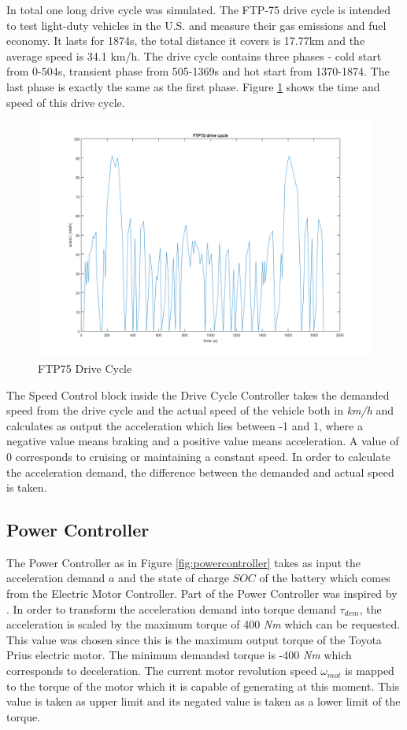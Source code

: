 In total one long drive cycle was simulated. The FTP-75 drive cycle is intended to test light-duty vehicles in the U.S. and measure their gas emissions and fuel economy. It lasts for 1874s, the total distance it covers is 17.77km and the average speed is 34.1 km/h. The drive cycle contains three phases - cold start from 0-504s, transient phase from 505-1369s and hot start from 1370-1874. The last phase is exactly the same as the first phase. Figure \ref{fig:ftp75} shows the time and speed of this drive 
cycle.

\begin{figure}[h]
\centering
\includegraphics[scale=0.3]{figures/FTP75}
\caption{FTP75 Drive Cycle}
\label{fig:ftp75}
\end{figure}


The Speed Control block inside the Drive Cycle Controller takes the demanded speed from the drive cycle and the actual speed of the vehicle both in \textit{km/h} and calculates as output the acceleration which lies between -1 and 1, where a negative value means braking and a positive value means acceleration. A value of 0 corresponds to cruising or maintaining a constant speed. In order to calculate the acceleration demand, the difference between the demanded and actual speed is taken.

\subsection{Power Controller}
\label{subsec:powerContr}
The Power Controller as in Figure \ref{fig:powercontroller} takes as input the acceleration demand $a$ and the state of charge $SOC$ of the battery which comes from the Electric Motor Controller. Part of the Power Controller was inspired by \citep{hevMatlab}. In order to transform the acceleration demand into torque demand $\tau_{dem}$, the acceleration is scaled by the maximum torque of 400 \textit{Nm} which can be requested. This value was chosen since this is the maximum output torque of the Toyota Prius electric motor. The minimum demanded torque is -400 \textit{Nm} which corresponds to deceleration. The current motor revolution speed $\omega_{mot}$ is mapped to the torque of the motor which it is capable of generating at this moment. This value is taken as upper limit and its negated value is taken as a lower limit of the torque. 

